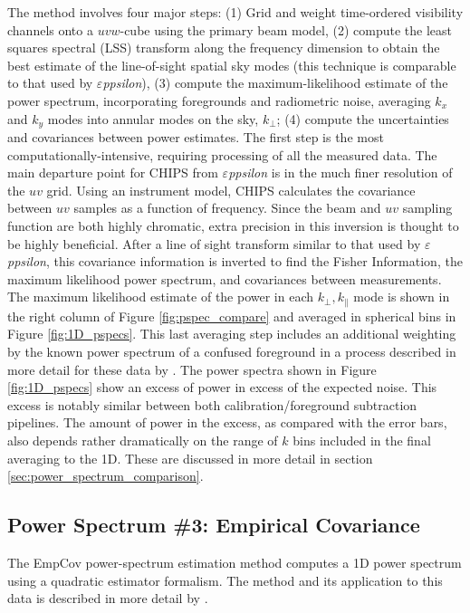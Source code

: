 \documentclass[twolcolumn]{emulateapj}
\def\eppsilon{{\it $\varepsilon$ppsilon}}
\def\empirical{EmpCov}
\def\chipscite{\cite{2016arXiv160102073T}}
\def\dilloncite{\cite{PhysRevD.91.123011} }
\begin{document}
The method involves four major steps: (1) Grid and weight time-ordered visibility channels onto a $uvw$-cube using the primary beam model, (2) compute the least squares spectral (LSS) transform along the frequency dimension to obtain the best estimate of the line-of-sight spatial sky modes (this technique is comparable to that used by \eppsilon), (3) compute the maximum-likelihood estimate of the power spectrum, incorporating foregrounds and radiometric noise,  averaging $k_x$ and $k_y$ modes into annular modes on the sky, $k_\bot$; (4) compute the uncertainties and covariances between power estimates. The first step is the most computationally-intensive, requiring processing of all the measured data. The main departure point for CHIPS from \eppsilon{} is in the much finer resolution of the $uv$ grid.  Using an instrument model, CHIPS calculates the covariance between $uv$ samples as a function of frequency.  Since the beam and $uv$ sampling function are both highly chromatic, extra precision in this inversion is thought to be highly beneficial. After a line of sight transform similar to that used by \eppsilon{}, this covariance information is inverted to find the Fisher Information, the maximum likelihood power spectrum, and covariances between measurements.  The maximum likelihood estimate of the power in each $k_\bot,k_\parallel$ mode is shown in the right column of Figure \ref{fig:pspec_compare} and averaged in spherical bins in Figure \ref{fig:1D_pspecs}. This last averaging step includes an additional weighting by the known power spectrum of a confused foreground in a process described in more detail for these data by \chipscite{}. The power spectra shown in Figure \ref{fig:1D_pspecs} show an excess of power in excess of the expected noise. This excess is notably similar between both calibration/foreground subtraction pipelines. The amount of power in the excess, as compared with the error bars, also depends rather dramatically on the range of $k$ bins included in the final averaging to the 1D.  These are discussed in more detail in section \ref{sec:power_spectrum_comparison}.

\subsection{Power Spectrum \#3: Empirical Covariance}
\label{sec:empirical_cov}

The \empirical{} power-spectrum estimation method computes a 1D power spectrum using a quadratic estimator formalism. The method and its application to this data is described in more detail by \dilloncite{}.
\end{document}
